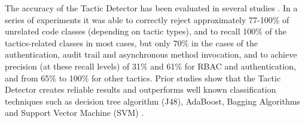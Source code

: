  
The accuracy of the Tactic Detector has been evaluated in several studies \cite{ICSE2012,FSE2014,Dissertation}.  In a series of  experiments it was able to correctly reject approximately 77-100\% of unrelated code classes (depending on tactic types), and to recall 100\% of the tactics-related classes in most cases, but only 70\% in the cases of the authentication, audit trail and asynchronous method invocation, and to achieve precision (at these recall levels) of 31\% and 61\% for RBAC and authentication, and from 65\% to 100\% for other tactics. Prior studies show that the Tactic Detector creates reliable results \cite{FSE2012,ICSE2012,Dissertation} and outperforms well known classification techniques such as decision tree algorithm (J48), AdaBoost, Bagging Algorithms and Support Vector Machine (SVM) \cite{Dissertation}.
